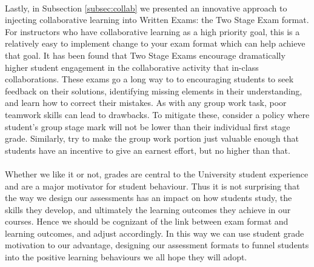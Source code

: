 \documentclass[12pt]{article}
\begin{document}
\paragraph{}
Lastly, in Subsection \ref{subsec:collab} we presented an innovative approach to injecting collaborative learning into Written Exams: the Two Stage Exam format. For instructors who have collaborative learning as a high priority goal, this is a relatively easy to implement change to your exam format which can help achieve that goal. It has been found that Two Stage Exams encourage dramatically higher student engagement in the collaborative activity that in-class collaborations. These exams go a long way to to encouraging students to seek feedback on their solutions, identifying missing elements in their understanding, and learn how to correct their mistakes. As with any group work task, poor teamwork skills can lead to drawbacks. To mitigate these, consider a policy where student's group stage mark will not be lower than their individual first stage grade. Similarly, try to make the group work portion just valuable enough that students have an incentive to give an earnest effort, but no higher than that. 
\paragraph{}
Whether we like it or not, grades are central to the University student experience and are a major motivator for student behaviour. Thus it is not surprising that the way we design our assessments has an impact on how students study, the skills they develop, and ultimately the learning outcomes they achieve in our courses. Hence we should be cognizant of the link between exam format and learning outcomes, and adjust accordingly. In this way we can use student grade motivation to our advantage, designing our assessment formats to funnel students into the positive learning behaviours we all hope they will adopt.
\newpage


\end{document}
